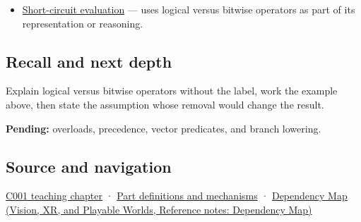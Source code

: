 \begin{itemize}
\tightlist
\item
  \hyperref[appendix-2e245a6fa8d3]{Short-circuit evaluation} --- uses logical versus bitwise operators as part of its representation or reasoning.
\end{itemize}

\subsection{Recall and next depth}\label{appendix-fe6b457d68d8-recall-and-next-depth}

Explain logical versus bitwise operators without the label, work the example above, then state the assumption whose removal would change the result.

\textbf{Pending:} overloads, precedence, vector predicates, and branch lowering.

\subsection{Source and navigation}\label{appendix-fe6b457d68d8-source-and-navigation}

\hyperref[01-foundations-i-ch001-from-a-signal-to-an-interpretation]{C001 teaching chapter} · \hyperref[appendix-fd090d982a15]{Part definitions and mechanisms} · \href{../07-Vision-XR-and-Playable-Worlds/main.pdf\#nameddest=appendix-4ad47bdd269a}{Dependency Map (Vision, XR, and Playable Worlds, Reference notes: Dependency Map)}
